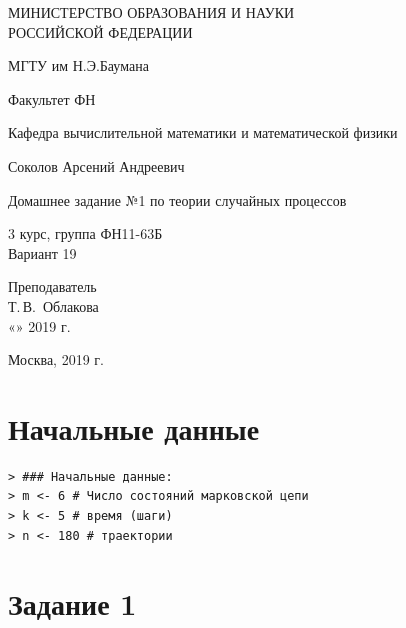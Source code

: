 \documentclass[14pt,a4paper]{scrartcl}
\begin{document}
	\begin{titlepage}
	\begin{center}
		\large
		МИНИСТЕРСТВО ОБРАЗОВАНИЯ И НАУКИ\\ РОССИЙСКОЙ ФЕДЕРАЦИИ
		
		\vspace{0.5cm}
		
		МГТУ им Н.Э.Баумана
		\vspace{0.25cm}
		
		Факультет ФН
		
		Кафедра вычислительной математики и математической физики
		\vfill
		
		
		Соколов Арсений Андреевич\\
		\vfill
		
		
		{\LARGE Домашнее задание №1 по теории случайных процессов\\[2mm]
		}
		\bigskip
		
		3 курс, группа ФН11-63Б\\
		Вариант 19
	\end{center}
	\vfill
	
	\newlength{\ML}
	\hfill\begin{minipage}{0.4\textwidth}
		Преподаватель\\
		\underline{\hspace{3cm}} Т.\,В.~Облакова\\
		«\underline{\hspace{0.7cm}}» \underline{\hspace{1.71cm}} 2019 г.
	\end{minipage}%
	\bigskip
	
	
	\vfill
	
	\begin{center}
		Москва, 2019 г.
	\end{center}
\end{titlepage}

\section*{Начальные данные}

\begin{verbatim}
> ### Начальные данные:
> m <- 6 # Число состояний марковской цепи
> k <- 5 # время (шаги)
> n <- 180 # траектории
\end{verbatim}

\section*{Задание 1}
\end{document}
